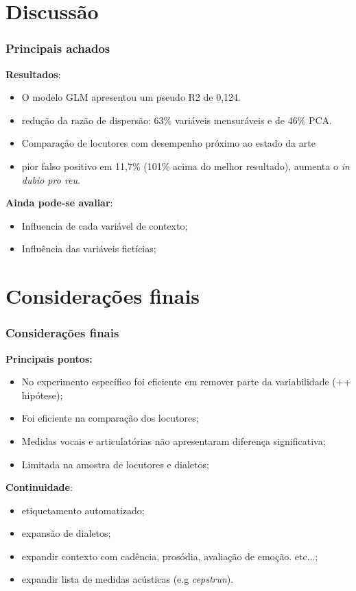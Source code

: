 \documentclass[121pt, aspectratio=169, t]{beamer}
\begin{document}
\section{Discussão}
\begin{frame}[fragile=singleslide]
	\frametitle{Principais achados}
	\textbf{Resultados}:
	\begin{itemize}
		\item O modelo GLM apresentou um pseudo R2 de 0,124.
		\item redução da razão de dispersão: 63\% variáveis mensuráveis e de 46\% PCA. 
		\item Comparação de locutores com desempenho próximo ao estado da arte \cite{Sztaho2023,Ishihara2021}
		\item pior falso positivo em 11,7\% (101\% acima do melhor resultado), aumenta o \textit{in dubio pro reu}.
	\end{itemize}
	
	\textbf{Ainda pode-se avaliar}:
	\begin{itemize}
		\item Influencia de cada variável de contexto;
		\item Influência das variáveis fictícias;
	\end{itemize}
\end{frame}
\section{Considerações finais}
\begin{frame}[fragile=singleslide]
	\frametitle{Considerações finais}
	
	\textbf{Principais pontos:}
	\begin{itemize}
		\item No experimento específico foi eficiente em remover parte da variabilidade (++ hipótese);
		\item Foi eficiente na comparação dos locutores;
		\item Medidas vocais e articulatórias não apresentaram diferença significativa;
		\item Limitada na amostra de locutores e dialetos;
	\end{itemize}
	
	\textbf{Continuidade}:
	\begin{itemize}
		\item etiquetamento automatizado;
		\item expansão de dialetos;
		\item expandir contexto com cadência, prosódia, avaliação de emoção. etc...;
		\item expandir lista de medidas acústicas (e.g \textit{cepstrun}).
	\end{itemize}
	
\end{frame}
\end{document}
